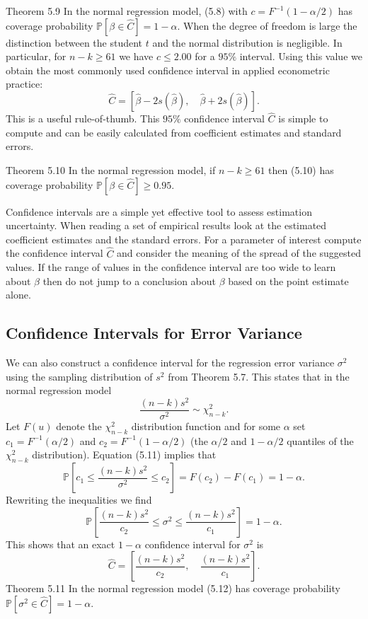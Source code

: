 \documentclass[10pt]{article}
\begin{document}
Theorem 5.9 In the normal regression model, (5.8) with $c=F^{-1}(1-\alpha / 2)$ has coverage probability $\mathbb{P}[\beta \in \widehat{C}]=1-\alpha$. When the degree of freedom is large the distinction between the student $t$ and the normal distribution is negligible. In particular, for $n-k \geq 61$ we have $c \leq 2.00$ for a $95 \%$ interval. Using this value we obtain the most commonly used confidence interval in applied econometric practice:
$$
\widehat{C}=[\widehat{\beta}-2 s(\widehat{\beta}), \quad \widehat{\beta}+2 s(\widehat{\beta})] .
$$
This is a useful rule-of-thumb. This $95 \%$ confidence interval $\widehat{C}$ is simple to compute and can be easily calculated from coefficient estimates and standard errors.

Theorem 5.10 In the normal regression model, if $n-k \geq 61$ then (5.10) has coverage probability $\mathbb{P}[\beta \in \widehat{C}] \geq 0.95$.

Confidence intervals are a simple yet effective tool to assess estimation uncertainty. When reading a set of empirical results look at the estimated coefficient estimates and the standard errors. For a parameter of interest compute the confidence interval $\widehat{C}$ and consider the meaning of the spread of the suggested values. If the range of values in the confidence interval are too wide to learn about $\beta$ then do not jump to a conclusion about $\beta$ based on the point estimate alone.

\subsection{Confidence Intervals for Error Variance}
We can also construct a confidence interval for the regression error variance $\sigma^{2}$ using the sampling distribution of $s^{2}$ from Theorem 5.7. This states that in the normal regression model
$$
\frac{(n-k) s^{2}}{\sigma^{2}} \sim \chi_{n-k}^{2} .
$$
Let $F(u)$ denote the $\chi_{n-k}^{2}$ distribution function and for some $\alpha$ set $c_{1}=F^{-1}(\alpha / 2)$ and $c_{2}=F^{-1}(1-\alpha / 2)$ (the $\alpha / 2$ and $1-\alpha / 2$ quantiles of the $\chi_{n-k}^{2}$ distribution). Equation (5.11) implies that
$$
\mathbb{P}\left[c_{1} \leq \frac{(n-k) s^{2}}{\sigma^{2}} \leq c_{2}\right]=F\left(c_{2}\right)-F\left(c_{1}\right)=1-\alpha .
$$
Rewriting the inequalities we find
$$
\mathbb{P}\left[\frac{(n-k) s^{2}}{c_{2}} \leq \sigma^{2} \leq \frac{(n-k) s^{2}}{c_{1}}\right]=1-\alpha .
$$
This shows that an exact $1-\alpha$ confidence interval for $\sigma^{2}$ is
$$
\widehat{C}=\left[\frac{(n-k) s^{2}}{c_{2}}, \quad \frac{(n-k) s^{2}}{c_{1}}\right] .
$$
Theorem 5.11 In the normal regression model (5.12) has coverage probability $\mathbb{P}\left[\sigma^{2} \in \widehat{C}\right]=1-\alpha$.
\end{document}
